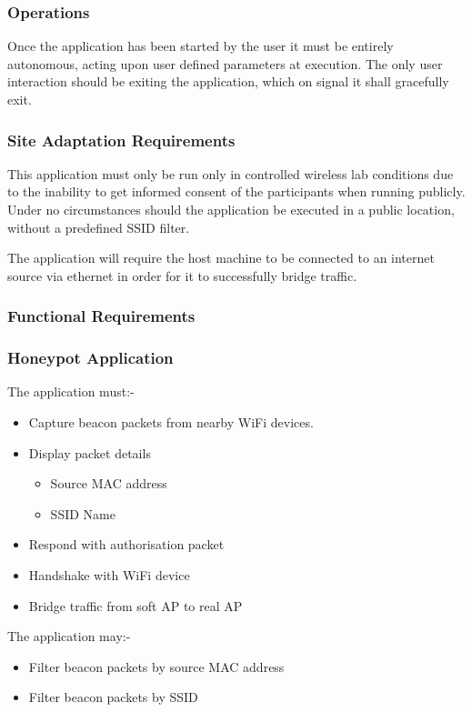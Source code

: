 \subsubsection{Operations}
Once the application has been started by the user it must be entirely autonomous, acting upon user defined parameters at execution. The only user interaction should be exiting the application, which on signal it shall gracefully exit.

\subsubsection{Site Adaptation Requirements}
This application must only be run only in controlled wireless lab conditions due to the inability to get informed consent of the participants when running publicly. Under no circumstances should the application be executed in a public location, without a predefined SSID filter.

The application will require the host machine to be connected to an internet source via ethernet in order for it to successfully bridge traffic.

\subsubsection{Functional Requirements}
\subsubsection*{Honeypot Application}
The application must:-
\begin{itemize}
	\item Capture beacon packets from nearby WiFi devices.
	\item Display packet details
		\begin{itemize}
			\item Source MAC address
			\item SSID Name
		\end{itemize}
	\item Respond with authorisation packet
	\item Handshake with WiFi device
	\item Bridge traffic from soft AP to real AP
\end{itemize}

The application may:-
\begin{itemize}
\item Filter beacon packets by source MAC address
\item Filter beacon packets by SSID
\end{itemize}

